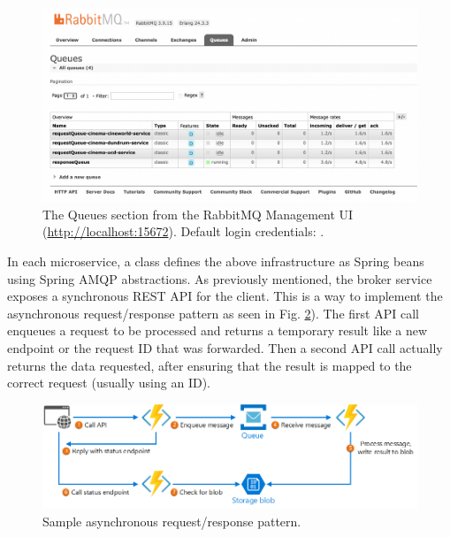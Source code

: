 \begin{figure}[H]
  \centering
  \includegraphics[width=1.0\linewidth]{./assets/images/case-studies/rmq-management.png}
  \caption{The Queues section from the RabbitMQ Management UI (\url{http://localhost:15672}). Default login credentials: .}
  \label{fig:rmq-management}
\end{figure}

In each microservice, a   class defines the above infrastructure as Spring beans using Spring AMQP abstractions. As previously mentioned, the broker service exposes a synchronous REST API for the client. This is a way to implement the asynchronous request/response pattern as seen in Fig. \ref{fig:async-req-res}). The first API call enqueues a request to be processed and returns a temporary result like a new endpoint or the request ID that was forwarded. Then a second API call actually returns the data requested, after ensuring that the result is mapped to the correct request (usually using an ID).

\begin{figure}[H]
  \centering
  \includegraphics[width=0.8\linewidth]{./assets/images/case-studies/async-req-res.png}
  \caption{Sample asynchronous request/response pattern.}
  \label{fig:async-req-res}
\end{figure}

